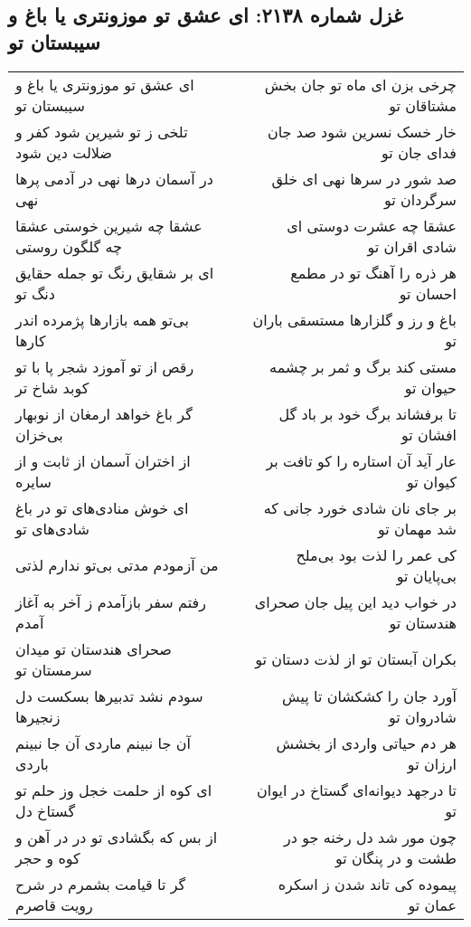 \begin{center}
\section*{غزل شماره ۲۱۳۸: ای عشق تو موزونتری یا باغ و سیبستان تو}
\label{sec:2138}
\begin{longtable}{l p{0.5cm} r}
ای عشق تو موزونتری یا باغ و سیبستان تو
&&
چرخی بزن ای ماه تو جان بخش مشتاقان تو
\\
تلخی ز تو شیرین شود کفر و ضلالت دین شود
&&
خار خسک نسرین شود صد جان فدای جان تو
\\
در آسمان درها نهی در آدمی پرها نهی
&&
صد شور در سرها نهی ای خلق سرگردان تو
\\
عشقا چه شیرین خوستی عشقا چه گلگون روستی
&&
عشقا چه عشرت دوستی ای شادی اقران تو
\\
ای بر شقایق رنگ تو جمله حقایق دنگ تو
&&
هر ذره را آهنگ تو در مطمع احسان تو
\\
بی‌تو همه بازارها پژمرده اندر کارها
&&
باغ و رز و گلزارها مستسقی باران تو
\\
رقص از تو آموزد شجر پا با تو کوبد شاخ تر
&&
مستی کند برگ و ثمر بر چشمه حیوان تو
\\
گر باغ خواهد ارمغان از نوبهار بی‌خزان
&&
تا برفشاند برگ خود بر باد گل افشان تو
\\
از اختران آسمان از ثابت و از سایره
&&
عار آید آن استاره را کو تافت بر کیوان تو
\\
ای خوش منادی‌های تو در باغ شادی‌های تو
&&
بر جای نان شادی خورد جانی که شد مهمان تو
\\
من آزمودم مدتی بی‌تو ندارم لذتی
&&
کی عمر را لذت بود بی‌ملح بی‌پایان تو
\\
رفتم سفر بازآمدم ز آخر به آغاز آمدم
&&
در خواب دید این پیل جان صحرای هندستان تو
\\
صحرای هندستان تو میدان سرمستان تو
&&
بکران آبستان تو از لذت دستان تو
\\
سودم نشد تدبیرها بسکست دل زنجیرها
&&
آورد جان را کشکشان تا پیش شادروان تو
\\
آن جا نبینم ماردی آن جا نبینم باردی
&&
هر دم حیاتی واردی از بخشش ارزان تو
\\
ای کوه از حلمت خجل وز حلم تو گستاخ دل
&&
تا درجهد دیوانه‌ای گستاخ در ایوان تو
\\
از بس که بگشادی تو در در آهن و کوه و حجر
&&
چون مور شد دل رخنه جو در طشت و در پنگان تو
\\
گر تا قیامت بشمرم در شرح رویت قاصرم
&&
پیموده کی تاند شدن ز اسکره عمان تو
\\
\end{longtable}
\end{center}
